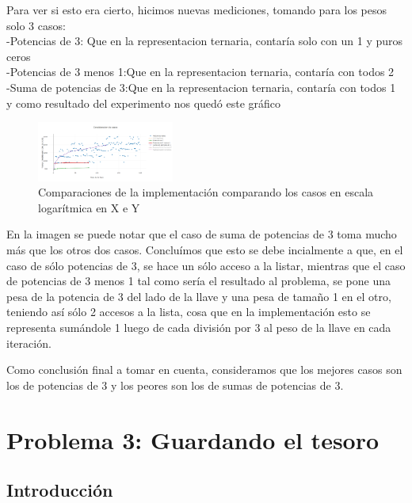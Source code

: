 \documentclass[spanish,12pt]{article}
\begin{document}
{Para ver si esto era cierto, hicimos nuevas mediciones, tomando para los pesos  solo 3 casos: \\
-Potencias de 3: Que en la representacion ternaria, contaría solo con un 1 y puros ceros \\
-Potencias de 3 menos 1:Que en la representacion ternaria, contaría con todos 2\\
-Suma de potencias de 3:Que en la representacion ternaria, contaría con todos 1\\

y como resultado del experimento nos quedó este gráfico
\begin{figure}[H]
\centering
\includegraphics[width=0.4\textwidth]{punto2-comparaciones}
\caption{Comparaciones de la implementaci\'on comparando los casos en escala logarítmica en X e Y }
\end{figure}

En la imagen se puede notar que el caso de suma de potencias de 3 toma mucho más que los otros dos casos. Concluímos que esto se debe incialmente a que, en el caso de sólo potencias de 3, se hace un sólo acceso a la listar, mientras que el caso de potencias de 3 menos 1
tal como sería el resultado al problema, se pone una pesa de la potencia de 3 del lado de la llave y una pesa de tamaño 1 en el otro, teniendo así sólo 2 accesos a la lista, cosa que en la implementación esto se representa sumándole 1 luego de cada división por 3 al peso de la llave en cada iteración.

Como conclusión final a tomar en cuenta, consideramos que los mejores casos son los de potencias de 3 y los peores son los de sumas de potencias de 3.






\section{Problema 3: Guardando el tesoro}

\subsection{Introducción}

}
\end{document}
